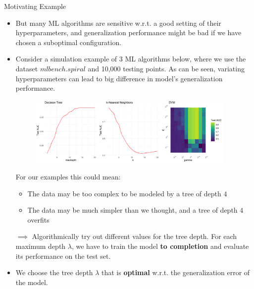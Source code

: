 \begin{vbframe}{Motivating Example}
\framebreak 

\begin{itemize}
\item But many ML algorithms are sensitive w.r.t. a good setting of their hyperparameters,
  and generalization performance might be bad if we have chosen a suboptimal configuration.
\item Consider a simulation example of 3 ML algorithms below, where we use the dataset $mlbench.spiral$ and 10,000 testing points. As can be seen, variating hyperparameters can lead to big difference in model's generalization performance.
  
  \begin{center}
\begin{figure}
\includegraphics[width=0.95\textwidth]{figure/tuning_importance.png}
\end{figure}
\end{center}

\framebreak
For our examples this could mean:

\begin{itemize}
\item The data may be too complex to be modeled by a tree of depth $4$ 
\item The data may be much simpler than we thought, and a tree of depth $4$ overfits
\end{itemize}
\item[$\implies$] Algorithmically try out different values for the tree depth. For each maximum depth $\lambda$, we have to train the model \textbf{to completion} and evaluate its performance on the test set. 
\item We choose the tree depth $\lambda$ that is \textbf{optimal} w.r.t. the generalization error of the model. 
\end{itemize}


\end{vbframe}


